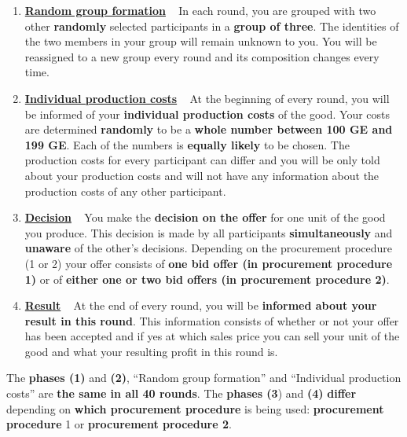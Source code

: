 \documentclass[11pt]{article}
\begin{document}
\begin{enumerate}[label=\textbf{\upshape(\arabic*\upshape)}]
	\item \textbf{\underline{Random group formation}} ~\smallbreak
		In each round, you are grouped with two other \textbf{randomly} selected participants in a \textbf{group of three}. The identities of the two members in your group will remain unknown to you. You will be reassigned to a new group every round and its composition changes every time.
	\item \textbf{\underline{Individual production costs}} ~\smallbreak
		At the beginning of every round, you will be informed of your \textbf{individual production costs} of the good. Your costs are determined \textbf{randomly} to be a \textbf{whole number between 100 GE and 199 GE}. Each of the numbers is \textbf{equally likely} to be chosen. The production costs for every participant can differ and you will be only told about your production costs and will not have any information about the production costs of any other participant.
	\item \textbf{\underline{Decision}} ~\smallbreak
		You make the \textbf{decision on the offer} for one unit of the good you produce. This decision is made by all participants \textbf{simultaneously} and \textbf{unaware} of the other’s decisions. Depending on the procurement procedure (1 or 2) your offer consists of \textbf{one bid offer (in procurement procedure 1)} or of \textbf{either one or two bid offers (in procurement procedure 2)}.
	\item \textbf{\underline{Result}}  ~\smallbreak
		At the end of every round, you will be \textbf{informed about your result in this round}. This information consists of whether or not your offer has been accepted and if yes at which sales price you can sell your unit of the good and what your resulting profit in this round is.		
\end{enumerate}

The \textbf{phases (1)} and \textbf{(2)}, \enquote{Random group formation} and \enquote{Individual production costs} are \textbf{the same in all 40 rounds}. The \textbf{phases (3}) and \textbf{(4)} \textbf{differ} depending on \textbf{which procurement procedure} is being used: \textbf{procurement procedure }1 or \textbf{procurement procedure 2}.

\end{document}
